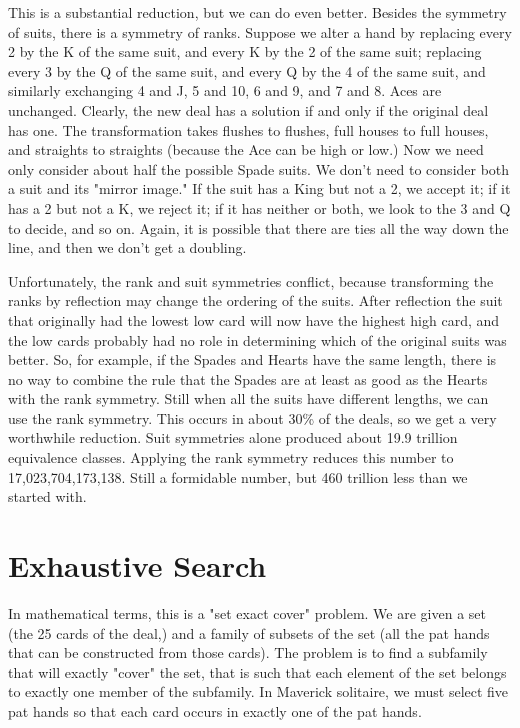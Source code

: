 \documentclass [12pt, letterpaper] {article}
\begin{document}
This is a substantial reduction, but we can do even better.  Besides the symmetry of suits, there is a symmetry of ranks.
Suppose we alter a hand by replacing every 2 by the K of the same suit, and every K by the 2 of the same suit; replacing
every 3 by the Q of the same suit, and every Q by the 4 of the same suit, and similarly exchanging 4 and J, 5 and 10, 6 and 9, and 7 and 8.
Aces are unchanged.  Clearly, the new deal has a solution if and only if the original deal has one.  The transformation takes flushes to 
flushes, full houses to full houses, and straights to straights (because the Ace can be high or low.)  
Now we need only consider about half the possible Spade suits.  We don't need to consider both a
suit and its "mirror image."  If the suit has a King but not a 2, we accept it; if it has a 2 but not a K, we reject it; if it has neither or both, 
we look to the 3 and Q to decide, and so on.  Again, it is possible that there are ties all the way down the line, and then we 
don't get a doubling.

Unfortunately, the rank and suit symmetries conflict, because transforming the ranks by reflection may change the ordering of the suits.  After reflection
the suit that originally had the lowest low card will now have the highest high card, and the low cards probably had no role in determining
which of the original suits was better.  So, for example, if the Spades and Hearts have the same length, there is no way to combine the rule 
that the Spades are at least as good as the Hearts with the rank symmetry.  Still when all the suits have different lengths, we can use the rank symmetry.
This occurs in about 30\% of the deals, so we get a very worthwhile reduction.  Suit symmetries alone produced about 19.9 trillion equivalence 
classes.  Applying the rank symmetry reduces this number to 17,023,704,173,138.  Still a formidable number, but 460 trillion less than we started with.

\section*{Exhaustive Search}

In mathematical terms, this is a "set exact cover" problem.  We are given a set (the 25 cards of the deal,) 
and a family of subsets of the set (all the pat hands that can be constructed from those cards).  The problem is 
to find a subfamily that will exactly "cover" the set, that is such that each element of the set belongs to exactly 
one member of the subfamily.  In Maverick solitaire, we must select five pat hands so that each card occurs 
in exactly one of the pat hands.
\end{document}
